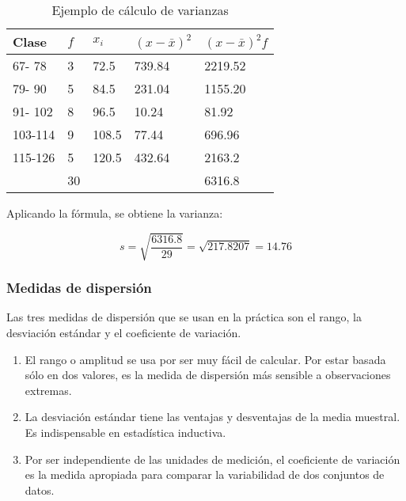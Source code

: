 \begin{example}
    \begin{table}[h!]
        \centering
        \begin{tabular}{@{}lllll@{}}
            \toprule
            Clase   & $f$ & $x_i$ & $\left(x-\bar{x}\right)^2$ & $\left(x-\bar{x}\right)^2f$ \\ \midrule
            67- 78  & 3   & 72.5  & 739.84                     & 2219.52                     \\
            79- 90  & 5   & 84.5  & 231.04                     & 1155.20                     \\
            91- 102 & 8   & 96.5  & 10.24                      & 81.92                       \\
            103-114 & 9   & 108.5 & 77.44                      & 696.96                      \\
            115-126 & 5   & 120.5 & 432.64                     & 2163.2                      \\
                    & 30  &       &                            & 6316.8                      \\ \bottomrule
        \end{tabular}
        \caption{ Ejemplo de cálculo de varianzas}
        \label{tabme1}
    \end{table}

    Aplicando la fórmula, se obtiene la varianza:

    \begin{equation*}
        s=\sqrt{\frac{6316.8}{29}}=\sqrt{217.8207}=14.76
    \end{equation*}
\end{example}

\subsubsection{Medidas de dispersión}

Las tres medidas de dispersión que se usan en la práctica
son el rango, la desviación estándar y el coeficiente de
variación.

\begin{enumerate}
    \item El rango o amplitud se usa por ser muy fácil de calcular. Por
          estar basada sólo en dos valores, es la medida de dispersión
          más sensible a observaciones extremas.
    \item La desviación estándar tiene las ventajas y desventajas de la
          media muestral. Es indispensable en estadística inductiva.
    \item Por ser independiente de las unidades de medición, el
          coeficiente de variación es la medida apropiada para
          comparar la variabilidad de dos conjuntos de datos.
\end{enumerate}


